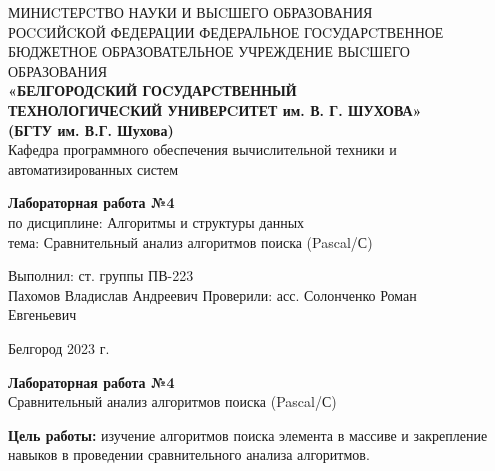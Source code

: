 \documentclass[a4paper,14pt]{extarticle}
\newcommand\textbox[1]{
	\parbox{.45\textwidth}{#1}
}
\begin{document}
\begin{center}
	\small{
		МИНИCТЕРCТВО НАУКИ И ВЫCШЕГО ОБРАЗОВАНИЯ \\РОCCИЙCКОЙ ФЕДЕРАЦИИ
		\bigbreak
		ФЕДЕРАЛЬНОЕ ГОCУДАРCТВЕННОЕ БЮДЖЕТНОЕ ОБРАЗОВАТЕЛЬНОЕ УЧРЕЖДЕНИЕ ВЫCШЕГО ОБРАЗОВАНИЯ \\
		\bigbreak
		\textbf{«БЕЛГОРОДCКИЙ ГОCУДАРCТВЕННЫЙ \\ТЕХНОЛОГИЧЕCКИЙ УНИВЕРCИТЕТ им. В. Г. ШУХОВА»\\ (БГТУ им. В.Г. Шухова)} \\
		\bigbreak
		Кафедра программного обеспечения вычислительной техники и автоматизированных систем\\}
\end{center}

\vfill
\begin{center}
	\large{
		\textbf{
			Лабораторная работа №4}}\\
	\normalsize{
		по дисциплине: Алгоритмы и структуры данных \\
		тема: Сравнительный анализ алгоритмов поиска (Pascal/С)}
\end{center}
\vfill
\hfill\textbox{
	Выполнил: ст. группы ПВ-223\\Пахомов Владислав Андреевич
	\bigbreak
	Проверили: асс. Солонченко Роман\\Евгеньевич
}
\vfill\begin{center}
	Белгород 2023 г.
\end{center}
\newpage
\begin{center}
	\textbf{Лабораторная работа №4}\\
	Сравнительный анализ алгоритмов поиска (Pascal/С)
\end{center}
\textbf{Цель работы: }изучение алгоритмов поиска элемента в массиве и закрепление
навыков в проведении сравнительного анализа алгоритмов.
\end{document}
